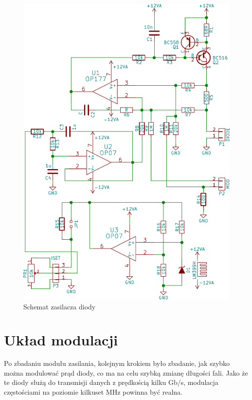 \documentclass[a4paper,10pt,twoside]{report}
\begin{document}
\begin{figure}
\begin{center}
 \includegraphics{./obrazki/VcselPSU.pdf}
\end{center}
\caption{Schemat zasilacza diody}
\label{sch-psu}
\end{figure}

\section{Układ modulacji}

Po zbadaniu modułu zasilania, kolejnym krokiem było zbadanie, jak szybko można modulować prąd diody, co ma na celu szybką zmianę długości fali. Jako że te diody służą do transmisji danych z prędkością kilku Gb/s, modulacja częstościami na poziomie kilkuset MHz powinna być realna. 
\end{document}
